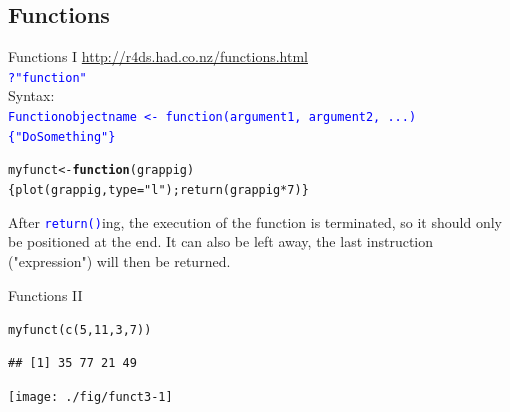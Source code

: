 \documentclass[xcolor=table,       handout,    xcolor=dvipsnames]{beamer}\usepackage[]{graphicx}\usepackage[]{color}
\makeatletter
\newcommand{\hlnum}[1]{\textcolor[rgb]{0,0,0}{#1}}
\newcommand{\hlstr}[1]{\textcolor[rgb]{0.545,0.137,0.137}{#1}}
\newcommand{\hlopt}[1]{\textcolor[rgb]{0,0,0}{#1}}
\newcommand{\hlstd}[1]{\textcolor[rgb]{0,0,0}{#1}}
\newcommand{\hlkwa}[1]{\textcolor[rgb]{1,0,0}{\textbf{#1}}}
\newcommand{\hlkwb}[1]{\textcolor[rgb]{0,0,0}{#1}}
\newcommand{\hlkwc}[1]{\textcolor[rgb]{1,0,1}{#1}}
\newcommand{\hlkwd}[1]{\textcolor[rgb]{0,0,1}{#1}}
\newenvironment{kframe}{%
 \def\at@end@of@kframe{}%
 \ifinner\ifhmode%
  \def\at@end@of@kframe{\end{minipage}}%
  \begin{minipage}{\columnwidth}%
 \fi\fi%
 \def\FrameCommand##1{\hskip\@totalleftmargin \hskip-\fboxsep
 \colorbox{shadecolor}{##1}\hskip-\fboxsep
     \hskip-\linewidth \hskip-\@totalleftmargin \hskip\columnwidth}%
 \MakeFramed {\advance\hsize-\width
   \@totalleftmargin\z@ \linewidth\hsize
   \@setminipage}}%
 {\par\unskip\endMakeFramed%
 \at@end@of@kframe}
\newenvironment{knitrout}{}{} %
\newcommand{\rcode}[1]{\texttt{\textcolor{Blue}{#1}}} %
\makeatother
\begin{document}
\subsection{Functions}

\begin{frame}[fragile]{Functions I}
\href{http://r4ds.had.co.nz/functions.html}{http://r4ds.had.co.nz/functions.html}\\
\pause
\rcode{?"function"}\\
\pause  Syntax:\\
\rcode{Functionobjectname <- \alert{function}(argument1, argument2, ...) \{"DoSomething"\}}\\
\pause
\begin{knitrout}
\color{fgcolor}\begin{kframe}
\begin{alltt}
\hlstd{myfunct} \hlkwb{<-} \hlkwa{function}\hlstd{(}\hlkwc{grappig}\hlstd{)}
       \hlstd{\{}\hlkwd{plot}\hlstd{(grappig,} \hlkwc{type}\hlstd{=}\hlstr{"l"}\hlstd{);} \hlkwd{return}\hlstd{(grappig}\hlopt{*}\hlnum{7}\hlstd{)  \}}
\end{alltt}
\end{kframe}
\end{knitrout}
\pause
After \rcode{return()}ing, the execution of the function is terminated, so it should only be positioned at the end. It can also be left away, the last instruction ("expression") will then be returned.
\end{frame}


\begin{frame}[fragile]{Functions II}
\begin{knitrout}
\color{fgcolor}\begin{kframe}
\begin{alltt}
\hlkwd{myfunct}\hlstd{(}   \hlkwd{c}\hlstd{(}\hlnum{5}\hlstd{,}\hlnum{11}\hlstd{,}\hlnum{3}\hlstd{,}\hlnum{7}\hlstd{)  )}
\end{alltt}
\begin{verbatim}
## [1] 35 77 21 49
\end{verbatim}
\end{kframe}

{\centering \texttt{[image: ./fig/funct3-1]} 

}



\end{knitrout}
\end{frame}
\end{document}
